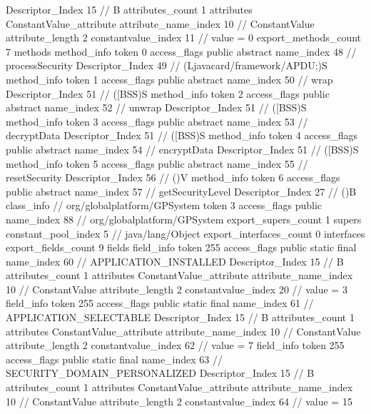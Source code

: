 {{{{{				Descriptor_Index	15		// B
				attributes_count	1
				attributes {
				ConstantValue_attribute {
					attribute_name_index	10		// ConstantValue
					attribute_length	2
					constantvalue_index	11		// value = 0
				}
				}
			}
			}
			export_methods_count	7
			methods {
				method_info {
					token	0
					access_flags	public abstract
					name_index	48		// processSecurity
					Descriptor_Index	49		// (Ljavacard/framework/APDU;)S
				}
				method_info {
					token	1
					access_flags	public abstract
					name_index	50		// wrap
					Descriptor_Index	51		// ([BSS)S
				}
				method_info {
					token	2
					access_flags	public abstract
					name_index	52		// unwrap
					Descriptor_Index	51		// ([BSS)S
				}
				method_info {
					token	3
					access_flags	public abstract
					name_index	53		// decryptData
					Descriptor_Index	51		// ([BSS)S
				}
				method_info {
					token	4
					access_flags	public abstract
					name_index	54		// encryptData
					Descriptor_Index	51		// ([BSS)S
				}
				method_info {
					token	5
					access_flags	public abstract
					name_index	55		// resetSecurity
					Descriptor_Index	56		// ()V
				}
				method_info {
					token	6
					access_flags	public abstract
					name_index	57		// getSecurityLevel
					Descriptor_Index	27		// ()B
				}
			}
		}
		class_info {		// org/globalplatform/GPSystem
			token	3
			access_flags	public
			name_index	88		// org/globalplatform/GPSystem
			export_supers_count	1
			supers {
				constant_pool_index	5		// java/lang/Object
			}
			export_interfaces_count	0
			interfaces {
			}
			export_fields_count	9
			fields {
			field_info {
				token	255
				access_flags	public static final
				name_index	60		// APPLICATION_INSTALLED
				Descriptor_Index	15		// B
				attributes_count	1
				attributes {
				ConstantValue_attribute {
					attribute_name_index	10		// ConstantValue
					attribute_length	2
					constantvalue_index	20		// value = 3
				}
				}
			}
			field_info {
				token	255
				access_flags	public static final
				name_index	61		// APPLICATION_SELECTABLE
				Descriptor_Index	15		// B
				attributes_count	1
				attributes {
				ConstantValue_attribute {
					attribute_name_index	10		// ConstantValue
					attribute_length	2
					constantvalue_index	62		// value = 7
				}
				}
			}
			field_info {
				token	255
				access_flags	public static final
				name_index	63		// SECURITY_DOMAIN_PERSONALIZED
				Descriptor_Index	15		// B
				attributes_count	1
				attributes {
				ConstantValue_attribute {
					attribute_name_index	10		// ConstantValue
					attribute_length	2
					constantvalue_index	64		// value = 15
}}}}}}}

